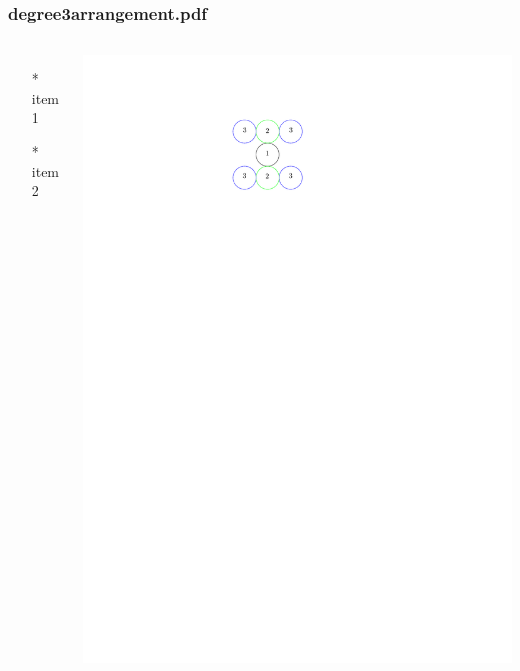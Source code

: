 \begin{frame} \frametitle{degree3arrangement.pdf}
    \begin{columns}[c]
        \begin{itemize}
            \item[*] item 1
            \item[*] item 2
        \end{itemize}
        \begin{minipage}{\linewidth}
            \begin{center}
            \includegraphics[width=.9\textwidth]{graphics/degree3arrangement.pdf}
            \label{gfx:degree3arrangement.pdf}
            \end{center}
        \end{minipage}
    \end{columns}
\end{frame}
